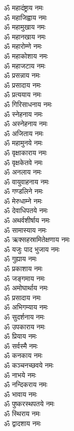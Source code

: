 \begin{multicols}{2}
\begin{flushleft}
ॐ महादंष्ट्राय नमः\\
ॐ महाजिह्वाय नमः\\
ॐ महामुखाय नमः\\
ॐ महानखाय नमः\\
ॐ महारोम्णे नमः\\
ॐ महाकोशाय नमः\\
ॐ महाजटाय नमः\\
ॐ प्रसन्नाय नमः\hfill{}\\
ॐ प्रसादाय नमः\\
ॐ प्रत्ययाय नमः\\
ॐ गिरिसाधनाय नमः\\
ॐ स्नेहनाय नमः\\
ॐ अस्नेहनाय नमः\\
ॐ अजिताय नमः\\
ॐ महामुनये नमः\\
ॐ वृक्षाकाराय नमः\\
ॐ वृक्षकेतवे नमः\\
ॐ अनलाय नमः\hfill{}\\
ॐ वायुवाहनाय नमः\\
ॐ गण्डलिने नमः\\
ॐ मेरुधाम्ने नमः\\
ॐ देवाधिपतये नमः\\
ॐ अथर्वशीर्षाय नमः\\
ॐ सामास्याय नमः\\
ॐ ऋक्सहस्रामितेक्षणाय नमः\\
ॐ यजुः पाद भुजाय नमः\\
ॐ गुह्याय नमः\\
ॐ प्रकाशाय नमः\hfill{}\\
ॐ जङ्गमाय नमः\\
ॐ अमोघार्थाय नमः\\
ॐ प्रसादाय नमः\\
ॐ अभिगम्याय नमः\\
ॐ सुदर्शनाय नमः\\
ॐ उपकाराय नमः\\
ॐ प्रियाय नमः\\
ॐ सर्वस्मै नमः\\
ॐ कनकाय नमः\\
ॐ कञ्चनच्छवये नमः\hfill{}\\
ॐ नाभये नमः\\
ॐ नन्दिकराय नमः\\
ॐ भावाय नमः\\
ॐ पुष्करस्थपतये नमः\\
ॐ स्थिराय नमः\\
ॐ द्वादशाय नमः\\

\end{flushleft}
\end{multicols}
